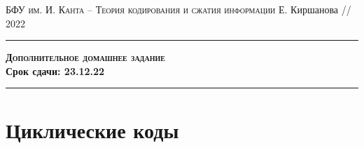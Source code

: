 \documentclass[11pt]{exam}
\theoremstyle{definition}
\begin{document}
	{\noindent
		\textsc{БФУ им. И. Канта -- Теория кодирования и сжатия информации}
		\hfill {Е. Киршанова // 2022\\}
	\hrule
	\begin{center}
		{\Large\textbf{
				\textsc{Дополнительное домашнее задание} \\[5pt] {Срок сдачи: 23.12.22}
		} } 
	\end{center}
	\hrule \vspace{5mm}
	
	\thispagestyle{empty}
	
	\vspace{0.2cm}
	\section{Циклические коды}
	
}
\end{document}
